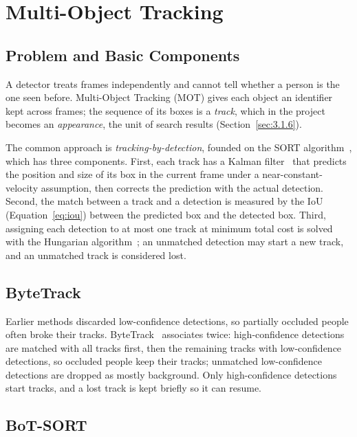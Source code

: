 \section{Multi-Object Tracking}
\label{sec:3.3}

\subsection{Problem and Basic Components}
\label{sec:3.3.1}
\label{sec:3.3.2}

A detector treats frames independently and cannot tell whether a person is the one seen before. Multi-Object Tracking (MOT) gives each object an identifier kept across frames; the sequence of its boxes is a \emph{track}, which in the project becomes an \emph{appearance}, the unit of search results (Section~\ref{sec:3.1.6}).

The common approach is \emph{tracking-by-detection}, founded on the SORT algorithm~\cite{bewley2016sort}, which has three components. First, each track has a Kalman filter~\cite{kalman1960} that predicts the position and size of its box in the current frame under a near-constant-velocity assumption, then corrects the prediction with the actual detection. Second, the match between a track and a detection is measured by the IoU (Equation~\ref{eq:iou}) between the predicted box and the detected box. Third, assigning each detection to at most one track at minimum total cost is solved with the Hungarian algorithm~\cite{kuhn1955hungarian}; an unmatched detection may start a new track, and an unmatched track is considered lost.

\subsection{ByteTrack}
\label{sec:3.3.3}

Earlier methods discarded low-confidence detections, so partially occluded people often broke their tracks. ByteTrack~\cite{zhang2022bytetrack} associates twice: high-confidence detections are matched with all tracks first, then the remaining tracks with low-confidence detections, so occluded people keep their tracks; unmatched low-confidence detections are dropped as mostly background. Only high-confidence detections start tracks, and a lost track is kept briefly so it can resume.

\subsection{BoT-SORT}
\label{sec:3.3.4}

